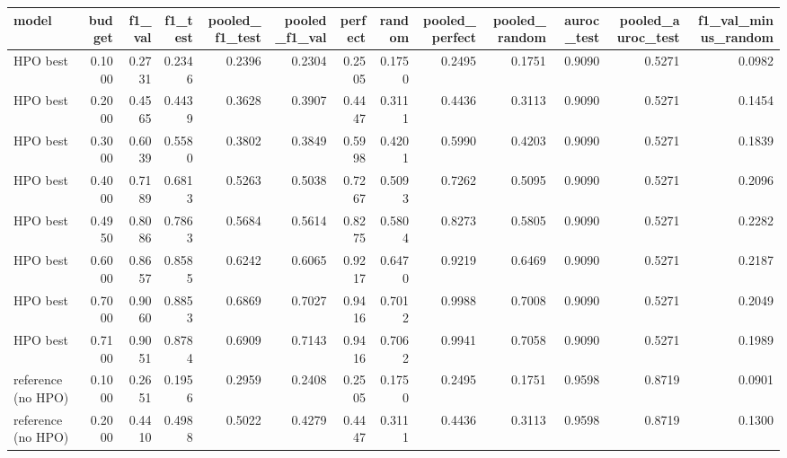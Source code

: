 \begin{tabular}{lrrrrrrrrrrrr}
\toprule
             model &  budget &  f1\_val &  f1\_test &  pooled\_f1\_test &  pooled\_f1\_val &  perfect &  random &  pooled\_perfect &  pooled\_random &  auroc\_test &  pooled\_auroc\_test &  f1\_val\_minus\_random \\
\midrule
          HPO best &  0.1000 &  0.2731 &   0.2346 &          0.2396 &         0.2304 &   0.2505 &  0.1750 &          0.2495 &         0.1751 &      0.9090 &             0.5271 &               0.0982 \\
          HPO best &  0.2000 &  0.4565 &   0.4439 &          0.3628 &         0.3907 &   0.4447 &  0.3111 &          0.4436 &         0.3113 &      0.9090 &             0.5271 &               0.1454 \\
          HPO best &  0.3000 &  0.6039 &   0.5580 &          0.3802 &         0.3849 &   0.5998 &  0.4201 &          0.5990 &         0.4203 &      0.9090 &             0.5271 &               0.1839 \\
          HPO best &  0.4000 &  0.7189 &   0.6813 &          0.5263 &         0.5038 &   0.7267 &  0.5093 &          0.7262 &         0.5095 &      0.9090 &             0.5271 &               0.2096 \\
          HPO best &  0.4950 &  0.8086 &   0.7863 &          0.5684 &         0.5614 &   0.8275 &  0.5804 &          0.8273 &         0.5805 &      0.9090 &             0.5271 &               0.2282 \\
          HPO best &  0.6000 &  0.8657 &   0.8585 &          0.6242 &         0.6065 &   0.9217 &  0.6470 &          0.9219 &         0.6469 &      0.9090 &             0.5271 &               0.2187 \\
          HPO best &  0.7000 &  0.9060 &   0.8853 &          0.6869 &         0.7027 &   0.9416 &  0.7012 &          0.9988 &         0.7008 &      0.9090 &             0.5271 &               0.2049 \\
          HPO best &  0.7100 &  0.9051 &   0.8784 &          0.6909 &         0.7143 &   0.9416 &  0.7062 &          0.9941 &         0.7058 &      0.9090 &             0.5271 &               0.1989 \\
reference (no HPO) &  0.1000 &  0.2651 &   0.1956 &          0.2959 &         0.2408 &   0.2505 &  0.1750 &          0.2495 &         0.1751 &      0.9598 &             0.8719 &               0.0901 \\
reference (no HPO) &  0.2000 &  0.4410 &   0.4988 &          0.5022 &         0.4279 &   0.4447 &  0.3111 &          0.4436 &         0.3113 &      0.9598 &             0.8719 &               0.1300 \\

\end{tabular}
